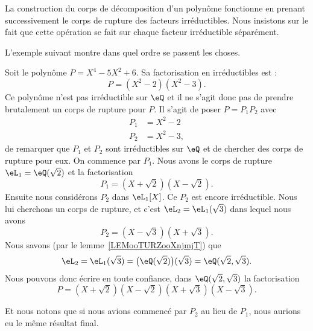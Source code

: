 \begin{normaltext}
    La construction du corps de décomposition d'un polynôme fonctionne en prenant successivement le corps de rupture des facteurs irréductibles. Nous insistons sur le fait que cette opération se fait sur chaque facteur irréductible séparément.

    L'exemple suivant montre dans quel ordre se passent les choses.

    \begin{example}
        Soit le polynôme \( P=X^4-5X^2+6\). Sa factorisation en irréductibles est :
        \begin{equation}
            P=(X^2-2)(X^2-3).
        \end{equation}
        Ce polynôme n'est pas irréductible sur \( \eQ\) et il ne s'agit donc pas de prendre brutalement un corps de rupture pour \( P\). Il s'agit de poser \( P=P_1P_2\) avec
        \begin{subequations}
            \begin{align}
                P_1&=X^2-2\\
                P_2&=X^2-3,
            \end{align}
        \end{subequations}
        de remarquer que \( P_1\) et \( P_2\) sont irréductibles sur \( \eQ\) et de chercher des corps de rupture pour eux. On commence par \( P_1\). Nous avons le corps de rupture \( \eL_1=\eQ(\sqrt{ 2 })\) et la factorisation
        \begin{equation}
            P_1=(X+\sqrt{ 2 })(X-\sqrt{ 2 }).
        \end{equation}
        Ensuite nous considérons \( P_2\) dans \( \eL_1[X]\). Ce \( P_2\) est encore irréductible. Nous lui cherchons un corps de rupture, et c'est \( \eL_2=\eL_1(\sqrt{ 3 })\) dans lequel nous avons
        \begin{equation}
            P_2=(X-\sqrt{ 3 })(X+\sqrt{ 3 }).
        \end{equation}
        Nous savons (par le lemme~\ref{LEMooTURZooXnjmjT}) que
        \begin{equation}
            \eL_2=\eL_1(\sqrt{ 3 })=\big( \eQ(\sqrt{ 2 }) \big)(\sqrt{ 3 })=\eQ(\sqrt{ 2 },\sqrt{ 3 }).
        \end{equation}
        Nous pouvons donc écrire en toute confiance, dans \( \eQ(\sqrt{ 2 },\sqrt{ 3 })\) la factorisation
        \begin{equation}
            P=(X+\sqrt{ 2 })(X-\sqrt{ 2 })(X+\sqrt{ 3 })(X-\sqrt{ 3 }).
        \end{equation}

        Et nous notons que si nous avions commencé par \( P_2\) au lieu de \( P_1\), nous aurions eu le même résultat final.
    \end{example}
\end{normaltext}

